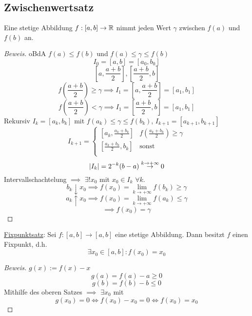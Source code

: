 \subsection{Zwischenwertsatz}
\begin{Sat}
  Eine stetige Abbildung $f:[a,b]\to\mathbb{R}$ nimmt jeden Wert $\gamma$ zwischen $f(a)$ und $f(b)$ an.
\end{Sat}
\begin{proof}[Beweis]
  oBdA $f(a)\leq f(b)$ und $f(a)\leq \gamma\leq f(b)$
  \[I_0=\left[ a,b \right]=\left[ a_0,b_0 \right]\]
  \[\left[ a,\frac{a+b}{2} \right],\left[ \frac{a+b}{2},b \right]\]
  \[f\left( \frac{a+b}{2} \right)\geq\gamma\implies I_1=\left[ a,\frac{a+b}{2} \right]=\left[ a_1,b_1 \right]\]
  \[f\left( \frac{a+b}{2} \right)<\gamma\implies I_1=\left[ \frac{a+b}{2},b \right]=\left[ a_1,b_1 \right]\]
  Rekursiv $I_k=\left[ a_k,b_k \right]$ mit $f(a_k)\leq\gamma\leq f(b_k)$, $I_{k+1}=\left[ a_{k+1},b_{k+1} \right]$
  \[I_{k+1}=\begin{cases}
    \left[ a_k,\frac{a_k+b_k}{2} \right]&f\left( \frac{a_k+b_k}{2} \right)\geq\gamma\\
    \left[ \frac{a_k+b_k}{2},b_k \right]&\text{sonst}\\
  \end{cases}\]
  \[\mathopen| I_k \mathclose|=2^{-k}(b-a)\stackrel{k\to+\infty}{\to}0\]
  Intervallschachtelung $\implies$ $\exists ! x_0$ mit $x_0\in I_k$ $\forall k$.
  \[b_k\downarrow x_0\implies f(x_0)=\lim_{k\to+\infty}f(b_k)\geq \gamma\]
  \[a_k\uparrow x_0\implies f(x_0)=\lim_{k\to+\infty}f(a_k)\leq \gamma\]
  \[\implies f(x_0)=\gamma\]
\end{proof}
\begin{Kor}
  \ul{Fixpunktsatz}: Sei $f:\left[ a,b \right]\to\left[ a,b \right]$ eine stetige Abbildung. Dann besitzt $f$ einen Fixpunkt, d.h.
  \[\exists x_0\in\left[ a,b \right]:f(x_0)=x_0\]
\end{Kor}
\begin{proof}[Beweis]
  $g(x):=f(x)-x$
  \[g(a)=f(a)-a\geq 0\]
  \[g(b)=f(b)-b\leq 0\]
  Mithilfe des oberen Satzes $\implies$ $\exists x_0$ mit 
  \[g(x_0)=0\iff f(x_0)-x_0=0\iff f(x_0)=x_0\]
\end{proof}
